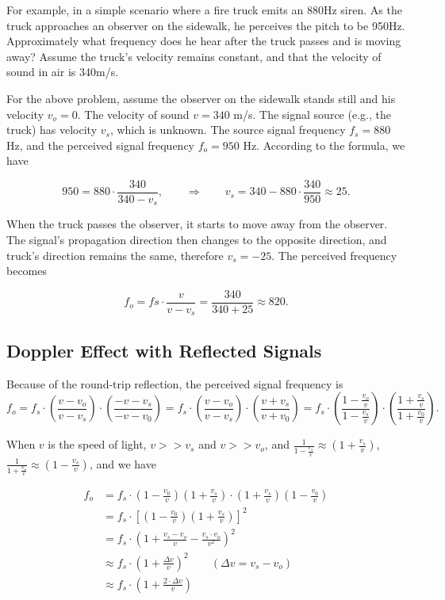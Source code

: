 \documentclass[11pt, oneside]{article}   	%
\begin{document}
For example, in a simple scenario where a fire truck emits an 880Hz siren. As the truck approaches an observer on the sidewalk, he perceives the pitch to be 950Hz. Approximately what frequency does he hear after the truck passes and is moving away? Assume the truck's velocity remains constant, and that the velocity of sound in air is 340m/s.

For the above problem, assume the observer on the sidewalk stands still and his velocity $v_o = 0$. The velocity of sound $v = 340$ m/s. The signal source (e.g., the truck) has velocity $v_s$, which is unknown. The source signal frequency $f_s = 880$ Hz, and the perceived signal frequency $f_o = 950$ Hz. According to the formula, we have

$$950 = 880\cdot \frac{340}{340 - v_s}, \qquad \Rightarrow \qquad v_s = 340 - 880\cdot \frac{340}{950} \approx 25.$$

When the truck passes the observer, it starts to move away from the observer. The signal's propagation direction then changes to the opposite direction, and truck's direction remains the same, therefore $v_s = -25$. The perceived frequency becomes 

$$f_o = fs\cdot \frac{v}{v - v_s} = \frac{340}{340+25} \approx 820.$$

\subsection{Doppler Effect with Reflected Signals}
Because of the round-trip reflection, the perceived signal frequency is 
 $$f_o = f_s \cdot \left(\frac{v - v_o}{v - v_s}\right)\cdot \left(\frac{-v - v_s}{-v - v_0}\right) = f_s\cdot  \left(\frac{v - v_o}{v - v_s}\right)\cdot \left(\frac{v + v_s}{v + v_0}\right) = f_s\cdot \left(\frac{1 - \frac{v_o}{v}}{1 - \frac{v_s}{v}}\right)\cdot \left(\frac{1 + \frac{v_s}{v}}{1 + \frac{v_0}{v}}\right). $$

When $v$ is the speed of light, $v >> v_s$ and $v >> v_o$, and $\frac{1}{1-\frac{v_s}{v}} \approx (1+\frac{v_s}{v})$, $\frac{1}{1+\frac{v_s}{v}} \approx (1-\frac{v_s}{v})$, and we have

\begin{align*}
f_o &= f_s \cdot (1-\frac{v_0}{v})(1 + \frac{v_s}{v})\cdot (1+\frac{v_s}{v})(1 - \frac{v_0}{v}) \\
& = f_s \cdot \left[(1-\frac{v_0}{v})(1 + \frac{v_s}{v})\right]^2\\
& = f_s \cdot \left(1 + \frac{v_s - v_o}{v} - \frac{v_s \cdot v_o}{v^2}\right)^2\\
& \approx f_s \cdot (1+\frac{\Delta v}{v})^2 \qquad (\Delta v = v_s - v_o)\\
& \approx f_s \cdot \left( 1 + \frac{2\cdot \Delta v}{v}\right)
\end{align*}
\end{document}
